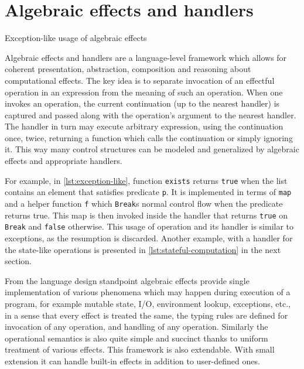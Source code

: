 \documentclass[inz, english, longabstract]{iithesis}
\begin{document}
\section{Algebraic effects and handlers}
\begin{listing}[t]
  \caption{Exception-like usage of algebraic effects}
  \label{lst:exception-like}
\end{listing}
Algebraic effects and handlers are a language-level framework which allows for coherent presentation, abstraction, composition and reasoning about computational effects.
The key idea is to separate invocation of an effectful operation in an expression from the meaning of such an operation.
When one invokes an operation, the current continuation (up to the nearest handler) is captured and passed along with the operation's argument to the nearest handler.
The handler in turn may execute arbitrary expression, using the continuation once, twice, returning a function which calls the continuation or simply ignoring it.
This way many control structures can be modeled and generalized by algebraic effects and appropriate handlers.

For example, in \autoref{lst:exception-like}, function \texttt{exists} returns \texttt{true} when the list contains an element that satisfies predicate \texttt{p}.
It is implemented in terms of \texttt{map} and a helper function \texttt{f} which \texttt{Break}s normal control flow when the predicate returns true.
This map is then invoked inside the handler that returns \texttt{true} on \texttt{Break} and \texttt{false} otherwise.
This usage of operation and its handler is similar to exceptions, as the resumption is discarded.
Another example, with a handler for the state-like operations is presented in \autoref{lst:stateful-computation} in the next section.

From the language design standpoint algebraic effects provide single implementation of various phenomena which may happen during execution of a program, for example mutable state, I/O, environment lookup, exceptions, etc., in a sense that every effect is treated the same, the typing rules are defined for invocation of any operation, and handling of any operation.
Similarly the operational semantics is also quite simple and succinct thanks to uniform treatment of various effects.
This framework is also extendable.
With small extension it can handle built-in effects in addition to user-defined ones.
\end{document}

